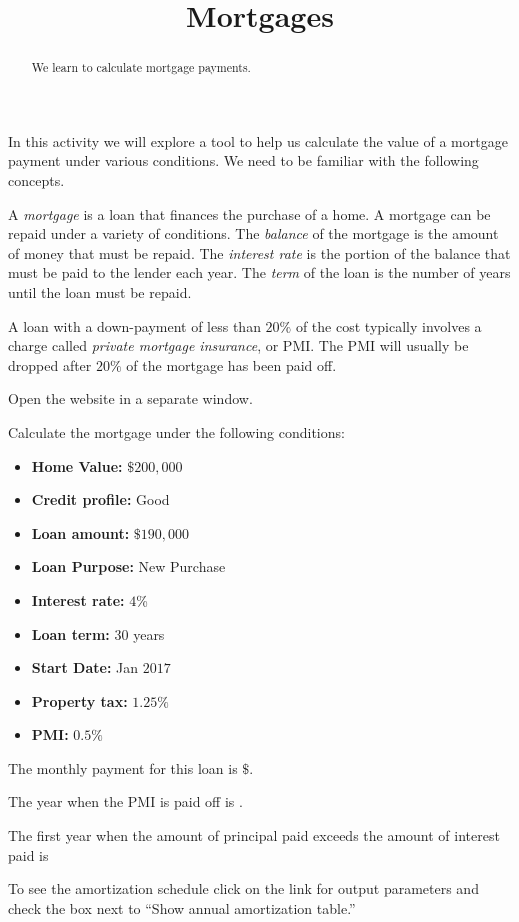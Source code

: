 \documentclass{ximera}
\title{Mortgages}
\begin{document}
\begin{abstract}
We learn to calculate mortgage payments.
\end{abstract}
\maketitle

In this activity we will explore a tool to help us calculate the value of a mortgage payment under various conditions. We need to be familiar with the following concepts.  

A \emph{mortgage} is a loan that finances the purchase of a home. A mortgage can be repaid under a variety of conditions. The \emph{balance} of the mortgage is the amount of money that must be repaid. The \emph{interest rate} is the portion of the balance that must be paid to the lender each year. The \emph{term} of the loan is the number of years until the loan must be repaid.

A loan with a down-payment of less than $20\%$ of the cost typically involves a charge called \emph{private mortgage insurance}, or PMI. The PMI will usually be dropped after $20\%$ of the mortgage has been paid off.

Open the website  in a separate window. 

\begin{question}
Calculate the mortgage under the following conditions:
\begin{itemize}
\item\textbf{Home Value:} $\$200,000$
\item\textbf{Credit profile:} Good
\item\textbf{Loan amount:} $\$190,000$
\item\textbf{Loan Purpose:} New Purchase
\item\textbf{Interest rate:} $4$\%
\item\textbf{Loan term:} $30$ years
\item\textbf{Start Date:} Jan $2017$
\item\textbf{Property tax:} $1.25\%$
\item\textbf{PMI:} $0.5\%$
\end{itemize}

The monthly payment for this loan is $\$$.

The year when the PMI is paid off is .

The first year when the amount of principal paid exceeds the amount of interest paid is 

\begin{hint}
To see the amortization schedule click on the link for output parameters and check the box next to ``Show annual amortization table.''
\end{hint}
\end{question}
\end{document}
